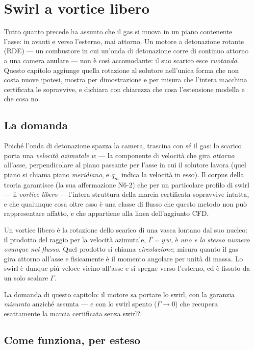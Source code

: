 \chapter{Swirl a vortice libero}
\label{ch:swirl}

Tutto quanto precede ha assunto che il gas si muova in un piano
contenente l'asse: in avanti e verso l'esterno, mai attorno. Un
motore a detonazione rotante (RDE) --- un combustore in cui un'onda
di detonazione corre di continuo attorno a una camera anulare --- non
è così accomodante: il suo scarico esce \emph{ruotando}. Questo
capitolo aggiunge quella rotazione al solutore nell'unica forma che
non costa nuove ipotesi, mostra per dimostrazione e per misura che
l'intera macchina certificata le sopravvive, e dichiara con chiarezza
che cosa l'estensione modella e che cosa no.

\section{La domanda}

Poiché l'onda di detonazione spazza la camera, trascina con sé il
gas: lo scarico porta una \emph{velocità azimutale} $w$ --- la
componente di velocità che gira \emph{attorno} all'asse,
perpendicolare al piano passante per l'asse in cui il solutore lavora
(quel piano si chiama piano \emph{meridiano}, e $q_m$ indica la
velocità in esso). Il corpus della teoria garantisce (la sua
affermazione N6-2) che per un particolare profilo di swirl --- il
\emph{vortice libero} --- l'intera struttura della marcia certificata
sopravvive intatta, e che qualunque cosa oltre esso è una classe di
flusso che questo metodo non può rappresentare affatto, e che
appartiene alla linea dell'aggiunto CFD.

Un vortice libero è la rotazione dello scarico di una vasca lontano
dal suo nucleo: il prodotto del raggio per la velocità azimutale,
$\Gamma = y\,w$, è \emph{uno e lo stesso numero ovunque nel flusso}.
Quel prodotto si chiama \emph{circolazione}; misura quanto il gas
gira attorno all'asse e fisicamente è il momento angolare per unità
di massa. Lo swirl è dunque più veloce vicino all'asse e si spegne
verso l'esterno, ed è fissato da un solo scalare $\Gamma$.

La domanda di questo capitolo: il motore sa portare lo swirl, con la
garanzia \emph{misurata} anziché assunta --- e con lo swirl spento
($\Gamma \to 0$) che recupera esattamente la marcia certificata senza
swirl?

\section{Come funziona, per esteso}


